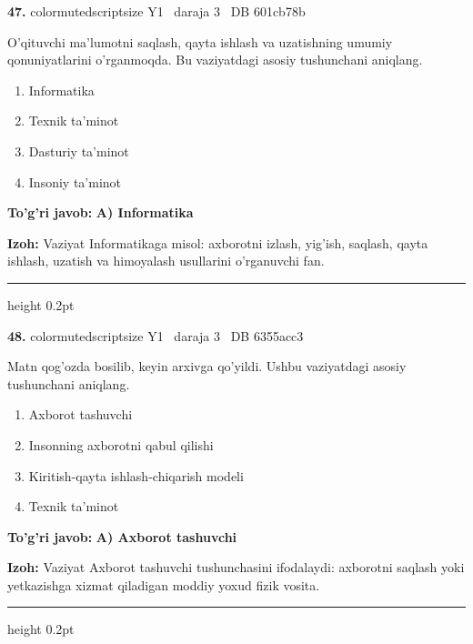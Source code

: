 \documentclass[10pt,a4paper,oneside]{article}
\begin{document}
\noindent\textbf{\color{ink}47.}  {color{muted}scriptsize Y1 \textbullet\ daraja 3 \textbullet\ DB 601cb78b}
\par
O'qituvchi ma'lumotni saqlash, qayta ishlash va uzatishning umumiy qonuniyatlarini o'rganmoqda. Bu vaziyatdagi asosiy tushunchani aniqlang.
\begin{enumerate}[label=\Alph*),leftmargin=9mm]
\item Informatika
\item Texnik ta'minot
\item Dasturiy ta'minot
\item Insoniy ta'minot
\end{enumerate}
\begin{tcolorbox}[enhanced,breakable,colback=teal!4,colframe=teal!50!black,boxrule=0.5pt,arc=1.1mm,left=3mm,right=3mm,top=1.7mm,bottom=1.7mm,before skip=2mm,after skip=2mm]
\textbf{\color{teal}To'g'ri javob:} \textbf{A) Informatika}
\par\smallskip
\textbf{Izoh:} Vaziyat Informatikaga misol: axborotni izlash, yig'ish, saqlash, qayta ishlash, uzatish va himoyalash usullarini o'rganuvchi fan.
\end{tcolorbox}
\vspace{2mm}\hrule height 0.2pt \vspace{3mm}

\noindent\textbf{\color{ink}48.}  {color{muted}scriptsize Y1 \textbullet\ daraja 3 \textbullet\ DB 6355acc3}
\par
Matn qog'ozda bosilib, keyin arxivga qo'yildi. Ushbu vaziyatdagi asosiy tushunchani aniqlang.
\begin{enumerate}[label=\Alph*),leftmargin=9mm]
\item Axborot tashuvchi
\item Insonning axborotni qabul qilishi
\item Kiritish-qayta ishlash-chiqarish modeli
\item Texnik ta'minot
\end{enumerate}
\begin{tcolorbox}[enhanced,breakable,colback=teal!4,colframe=teal!50!black,boxrule=0.5pt,arc=1.1mm,left=3mm,right=3mm,top=1.7mm,bottom=1.7mm,before skip=2mm,after skip=2mm]
\textbf{\color{teal}To'g'ri javob:} \textbf{A) Axborot tashuvchi}
\par\smallskip
\textbf{Izoh:} Vaziyat Axborot tashuvchi tushunchasini ifodalaydi: axborotni saqlash yoki yetkazishga xizmat qiladigan moddiy yoxud fizik vosita.
\end{tcolorbox}
\vspace{2mm}\hrule height 0.2pt \vspace{3mm}
\end{document}
